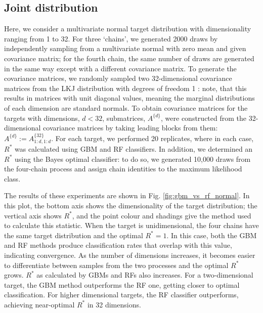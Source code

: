\documentclass{article}
\begin{document}
\subsection{Joint distribution}\label{sec:joint_distribution}
Here, we consider a multivariate normal target distribution with dimensionality ranging from 1 to 32. For three `chains', we generated 2000 draws by independently sampling from a multivariate normal with zero mean and given covariance matrix; for the fourth chain, the same number of draws are generated in the same way except with a different covariance matrix. To generate the covariance matrices, we randomly sampled two 32-dimensional covariance matrices from the LKJ distribution with degrees of freedom 1 \citep{lewandowski2009generating}: note, that this results in matrices with unit diagonal values, meaning the marginal distributions of each dimension are standard normals. To obtain covariance matrices for the targets with dimensions, $d<32$, submatrices, $A^{\{d\}}$, were constructed from the 32-dimensional covariance matrices by taking leading blocks from them: $A^{\{d\}}:=A^{\{32\}}_{1:d, 1:d}$. For each target, we performed 20 replicates, where in each case, $R^*$ was calculated using GBM and RF classifiers. In addition, we determined an $R^*$ using the Bayes optimal classifier: to do so, we generated 10,000 draws from the four-chain process and assign chain identities to the maximum likelihood class.  

The results of these experiments are shown in Fig. \ref{fig:gbm_vs_rf_normal}. In this plot, the bottom axis shows the dimensionality of the target distribution; the vertical axis shows $R^*$, and the point colour and shadings give the method used to calculate this statistic. When the target is unidimensional, the four chains have the same target distribution and the optimal $R^*=1$. In this case, both the GBM and RF methods produce classification rates that overlap with this value, indicating convergence. As the number of dimensions increases, it becomes easier to differentiate between samples from the two processes and the optimal $R^*$ grows. $R^*$ as calculated by GBMs and RFs also increases. For a two-dimensional target, the GBM method outperforms the RF one, getting closer to optimal classification. For higher dimensional targets, the RF classifier outperforms, achieving near-optimal $R^*$ in 32 dimensions.
\end{document}
